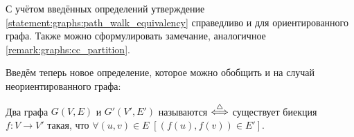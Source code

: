 С учётом введённых определений утверждение \ref{statement:graphs:path_walk_equivalency} справедливо и для ориентированного графа.
Также можно сформулировать замечание, аналогичное \ref{remark:graphs:cc_partition}.

Введём теперь новое определение, которое можно обобщить и на случай неориентированного графа:
\begin{definition}
    Два графа $ G(V, E) $ и $ G'(V', E') $ называются  $ \overset{\triangle}{\Longleftrightarrow} $ существует биекция $ f: V \to V' $ такая,
    что $ \forall (u, v) \in E \; \left[ (f(u), f(v)) \in E' \right] $.
\end{definition}
